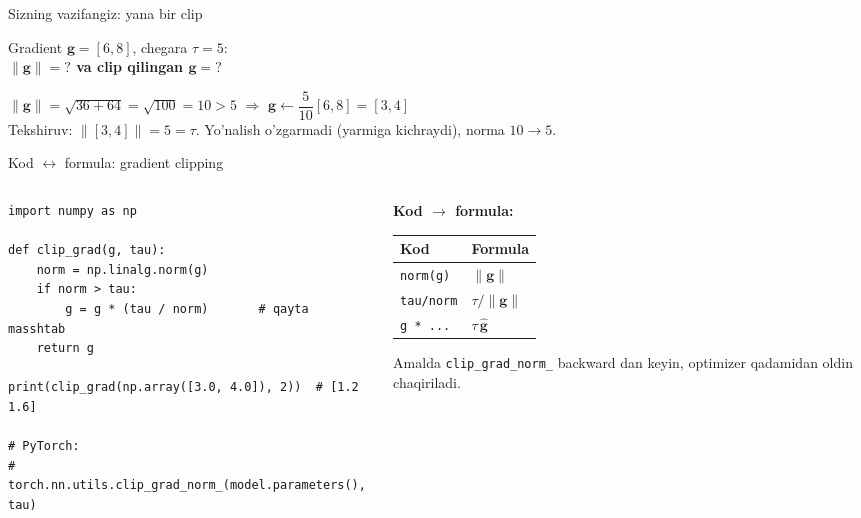 \documentclass[aspectratio=169,11pt]{beamer}
\begin{document}
\begin{frame}{Sizning vazifangiz: yana bir clip}
  \begin{tcolorbox}[warnbox,title=Savol --- 90 soniya]
    \small
    Gradient $\mathbf{g}=[6,8]$, chegara $\tau=5$:\\[4pt]
    \textbf{\large $\|\mathbf{g}\| = ?$ \quad va clip qilingan $\mathbf{g} = ?$}
  \end{tcolorbox}
  \pause
  \begin{tcolorbox}[okbox,title=Javob]
    \small
    $\|\mathbf{g}\| = \sqrt{36+64} = \sqrt{100} = 10 > 5$ $\Rightarrow$
    $\mathbf{g}\leftarrow \dfrac{5}{10}[6,8] = [3,4]$\\[3pt]
    \footnotesize Tekshiruv: $\|[3,4]\| = 5 = \tau$. Yo'nalish o'zgarmadi (yarmiga
    kichraydi), norma $10\to 5$.
  \end{tcolorbox}
\end{frame}

\begin{frame}[fragile]{Kod $\leftrightarrow$ formula: gradient clipping}
  \begin{columns}[T]
    \begin{column}{0.56\textwidth}
\begin{lstlisting}
import numpy as np

def clip_grad(g, tau):
    norm = np.linalg.norm(g)
    if norm > tau:
        g = g * (tau / norm)       # qayta masshtab
    return g

print(clip_grad(np.array([3.0, 4.0]), 2))  # [1.2 1.6]

# PyTorch:
# torch.nn.utils.clip_grad_norm_(model.parameters(), tau)
\end{lstlisting}
    \end{column}
    \begin{column}{0.40\textwidth}
      \textbf{Kod $\to$ formula:}\\[3pt]
      \footnotesize
      \begin{tabular}{p{2.0cm}p{2.0cm}}
        \toprule
        Kod & Formula \\
        \midrule
        \texttt{norm(g)} & $\|\mathbf{g}\|$ \\
        \texttt{tau/norm} & $\tau/\|\mathbf{g}\|$ \\
        \texttt{g * ...} & $\tau\,\hat{\mathbf{g}}$ \\
        \bottomrule
      \end{tabular}
      \vspace{4pt}
      \begin{tcolorbox}[okbox,top=2pt,bottom=2pt]
        \footnotesize
        Amalda \texttt{clip\_grad\_norm\_} backward dan keyin, optimizer qadamidan
        oldin chaqiriladi.
      \end{tcolorbox}
    \end{column}
  \end{columns}
\end{frame}
\end{document}
